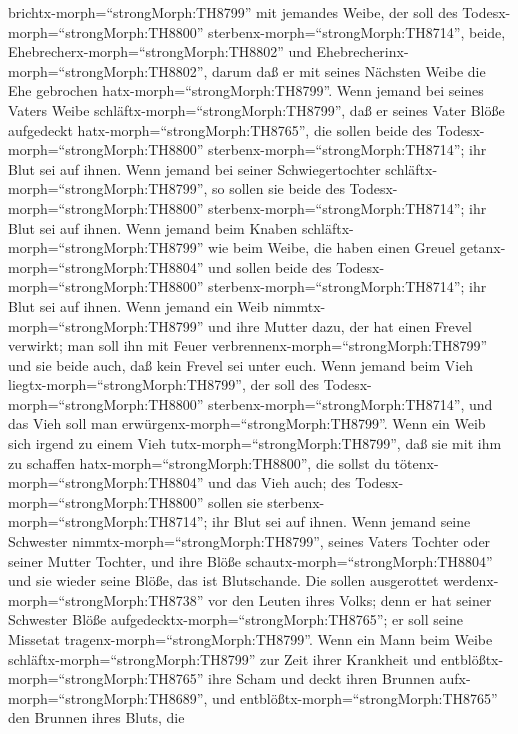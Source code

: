 brichtx-morph=``strongMorph:TH8799'' mit jemandes Weibe, der soll des
Todesx-morph=``strongMorph:TH8800''
sterbenx-morph=``strongMorph:TH8714'', beide,
Ehebrecherx-morph=``strongMorph:TH8802'' und
Ehebrecherinx-morph=``strongMorph:TH8802'', darum daß er mit seines
Nächsten Weibe die Ehe gebrochen hatx-morph=``strongMorph:TH8799''.
 Wenn jemand bei seines Vaters Weibe
schläftx-morph=``strongMorph:TH8799'', daß er seines Vater Blöße
aufgedeckt hatx-morph=``strongMorph:TH8765'', die sollen beide des
Todesx-morph=``strongMorph:TH8800''
sterbenx-morph=``strongMorph:TH8714''; ihr Blut sei auf ihnen.
 Wenn jemand bei seiner Schwiegertochter
schläftx-morph=``strongMorph:TH8799'', so sollen sie beide des
Todesx-morph=``strongMorph:TH8800''
sterbenx-morph=``strongMorph:TH8714''; ihr Blut sei auf ihnen.
 Wenn jemand beim Knaben
schläftx-morph=``strongMorph:TH8799'' wie beim Weibe, die haben einen
Greuel getanx-morph=``strongMorph:TH8804'' und sollen beide des
Todesx-morph=``strongMorph:TH8800''
sterbenx-morph=``strongMorph:TH8714''; ihr Blut sei auf ihnen.
 Wenn jemand ein Weib nimmtx-morph=``strongMorph:TH8799''
und ihre Mutter dazu, der hat einen Frevel verwirkt; man soll ihn mit
Feuer verbrennenx-morph=``strongMorph:TH8799'' und sie beide auch, daß
kein Frevel sei unter euch.  Wenn jemand beim Vieh
liegtx-morph=``strongMorph:TH8799'', der soll des
Todesx-morph=``strongMorph:TH8800''
sterbenx-morph=``strongMorph:TH8714'', und das Vieh soll man
erwürgenx-morph=``strongMorph:TH8799''.  Wenn ein Weib sich
irgend zu einem Vieh tutx-morph=``strongMorph:TH8799'', daß sie mit ihm
zu schaffen hatx-morph=``strongMorph:TH8800'', die sollst du
tötenx-morph=``strongMorph:TH8804'' und das Vieh auch; des
Todesx-morph=``strongMorph:TH8800'' sollen sie
sterbenx-morph=``strongMorph:TH8714''; ihr Blut sei auf ihnen.
 Wenn jemand seine Schwester
nimmtx-morph=``strongMorph:TH8799'', seines Vaters Tochter oder seiner
Mutter Tochter, und ihre Blöße schautx-morph=``strongMorph:TH8804'' und
sie wieder seine Blöße, das ist Blutschande. Die sollen ausgerottet
werdenx-morph=``strongMorph:TH8738'' vor den Leuten ihres Volks; denn er
hat seiner Schwester Blöße aufgedecktx-morph=``strongMorph:TH8765''; er
soll seine Missetat tragenx-morph=``strongMorph:TH8799''. 
Wenn ein Mann beim Weibe schläftx-morph=``strongMorph:TH8799'' zur Zeit
ihrer Krankheit und entblößtx-morph=``strongMorph:TH8765'' ihre Scham
und deckt ihren Brunnen aufx-morph=``strongMorph:TH8689'', und
entblößtx-morph=``strongMorph:TH8765'' den Brunnen ihres Bluts, die
